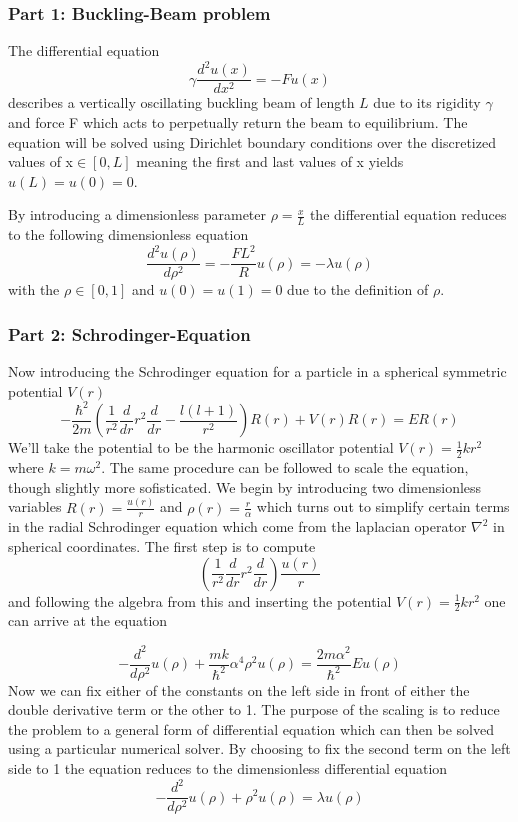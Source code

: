 \documentclass[aip,nobalancelastpage,
twocolumn,
rsi,%
 amsmath,amssymb,
 reprint,%
]{revtex4}
\begin{document}
\subsubsection{Part 1: Buckling-Beam problem}
The differential equation
\begin{equation}
\gamma \frac{d^2 u(x)}{dx^2}=-F u(x)
\end{equation}
describes a vertically oscillating buckling beam of length $L$ due to its rigidity $\gamma$ and force F which acts to perpetually return the beam to equilibrium. The equation will be solved using Dirichlet boundary conditions over the discretized values of x$\in [0, L]$ meaning the first and last values of x yields $u(L)=u(0)=0$.\par
By introducing a dimensionless parameter $\rho = \frac{x}{L}$ the differential equation reduces to the following dimensionless equation
\begin{equation}
\frac{d^2 u(\rho)}{d\rho^2}=-\frac{FL^2}{R}u(\rho)=-\lambda u(\rho)
\end{equation}
with the $\rho \in [0,1]$ and $u(0)=u(1)=0$ due to the definition of $\rho$.

\subsubsection{Part 2: Schrodinger-Equation}
Now introducing the Schrodinger equation for a particle in a spherical symmetric potential $V(r)$
\begin{equation}
-\frac{\hbar^2}{2m}\left(\frac{1}{r^2}\frac{d}{dr}r^2\frac{d}{dr}-\frac{l(l+1)}{r^2}\right)R(r)+V(r)R(r)=E R(r)
\end{equation} 
We'll take the potential to be the harmonic oscillator potential $V(r)=\frac{1}{2}k r^2$ where $k=m\omega^2$.
The same procedure can be followed to scale the equation, though slightly more sofisticated. We begin by introducing two dimensionless variables $R(r)=\frac{u(r)}{r}$ and $\rho(r)=\frac{r}{\alpha}$ which turns out to simplify certain terms in the radial Schrodinger equation which come from the laplacian operator $\nabla^2$ in spherical coordinates.
The first step is to compute 
\begin{equation}
\left(\frac{1}{r^2}\frac{d}{dr}r^2\frac{d}{dr}\right) \frac{u(r)}{r}
\end{equation}
and following the algebra from this and inserting the potential $V(r)=\frac{1}{2}k r^2$ one can arrive at the equation

\begin{equation}
-\frac{d^2}{d\rho^2}u(\rho) + \frac{mk}{\hbar^2}\alpha^4 \rho^2 u(\rho)=\frac{2m\alpha^2}{\hbar^2}Eu(\rho)
\end{equation}
Now we can fix either of the constants on the left side in front of either the double derivative term or the other to 1. The purpose of the scaling is to reduce the problem to a general form of differential equation which can then be solved using a particular numerical solver.
By choosing to fix the second term on the left side to 1 the equation reduces to the dimensionless differential equation
\begin{equation}
-\frac{d^2}{d\rho^2}u(\rho) +\rho^2 u(\rho) = \lambda u(\rho)
\end{equation}
\end{document}
